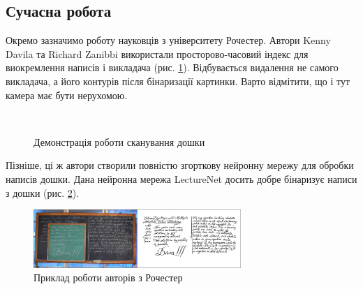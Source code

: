 \subsection{Сучасна робота}
Окремо зазначимо роботу \cite{davila:2017}
науковців з університету Рочестер. Автори Kenny Davila та Richard Zanibbi
використали просторово-часовий індекс для виокремлення написів і викладача (рис. \ref{fig:davila:2017}).
Відбувається видалення не самого викладача,  а його контурів після бінаризації картинки.
Варто відмітити, що і тут камера має бути нерухомою.
\begin{figure}[H]
  \centering
  \\
  \caption{Демонстрація роботи сканування дошки \cite{davila:2017}
    \label{fig:davila:2017}
  }
\end{figure}
Пізніше, ці ж автори створили повністю згорткову нейронну мережу \cite{davila:2021}
для обробки написів дошки. Дана нейронна мережа LectureNet досить добре бінаризує написи з дошки
(рис. \ref{fig:davila:2021}).
\begin{figure}[H]
  \centering
  \includegraphics[width=0.7\textwidth]{images/davila_2021}
  \caption{Приклад роботи авторів з Рочестер \cite{davila:2021}} 
  \label{fig:davila:2021}
\end{figure}

\clearpage